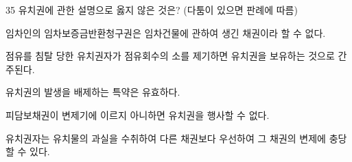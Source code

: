 \begin{question}{35}
유치권에 관한 설명으로 옳지 않은 것은? (다툼이 있으면 판례에 따름)
\begin{choices}
  \item 임차인의 임차보증금반환청구권은 임차건물에 관하여 생긴 채권이라 할 수 없다.
  \item 점유를 침탈 당한 유치권자가 점유회수의 소를 제기하면 유치권을 보유하는 것으로 간주된다.
  \item 유치권의 발생을 배제하는 특약은 유효하다.
  \item 피담보채권이 변제기에 이르지 아니하면 유치권을 행사할 수 없다.
  \item 유치권자는 유치물의 과실을 수취하여 다른 채권보다 우선하여 그 채권의 변제에 충당할 수 있다.
\end{choices}
\end{question}
